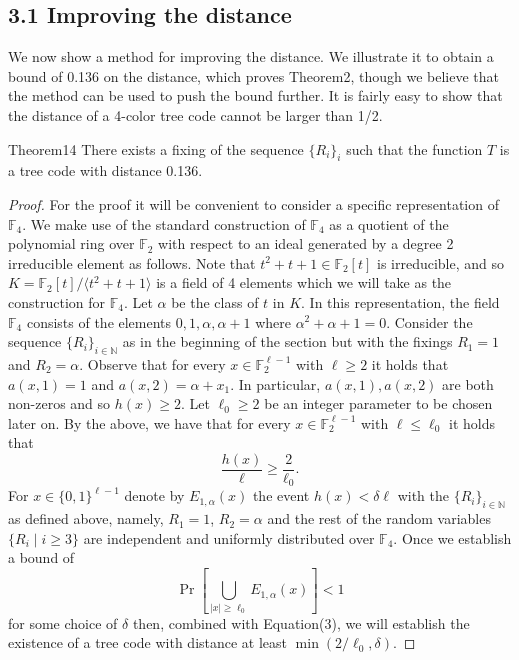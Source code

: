 \subsection*{3.1 Improving the distance}
We now show a method for improving the distance. We illustrate it to obtain a bound of 0.136 on the distance, which proves Theorem2, though we believe that the method can be used to push the bound further. It is fairly easy to show that the distance of a 4-color tree code cannot be larger than 1/2.
\begin{authorclaim}{Theorem14}
There exists a fixing of the sequence $\{R_i\}_i$ such that the function $T$ is a tree code with distance 0.136.
\end{authorclaim}
\begin{proof}
For the proof it will be convenient to consider a specific representation of $\mathbb F_4$. We make use of the standard construction of $\mathbb F_4$ as a quotient of the polynomial ring over $\mathbb F_2$ with respect to an ideal generated by a degree 2 irreducible element as follows. Note that $t^2+t+1\in\mathbb F_2[t]$ is irreducible, and so $K=\mathbb F_2[t]/\langle t^2+t+1\rangle$ is a field of 4 elements which we will take as the construction for $\mathbb F_4$. Let $\alpha$ be the class of $t$ in $K$. In this representation, the field $\mathbb F_4$ consists of the elements $0,1,\alpha,\alpha+1$ where $\alpha^2+\alpha+1=0$.
Consider the sequence $\{R_i\}_{i\in\mathbb N}$ as in the beginning of the section but with the fixings $R_1=1$ and $R_2=\alpha$. Observe that for every $x\in\mathbb F_2^{\ell-1}$ with $\ell\ge2$ it holds that $a(x,1)=1$ and $a(x,2)=\alpha+x_1$. In particular, $a(x,1),a(x,2)$ are both non-zeros and so $h(x)\ge2$. Let $\ell_0\ge2$ be an integer parameter to be chosen later on. By the above, we have that for every $x\in\mathbb F_2^{\ell-1}$ with $\ell\le\ell_0$ it holds that
\begin{equation}
\frac{h(x)}{\ell}\ge\frac2{\ell_0}.\tag{3}
\end{equation}
For $x\in\{0,1\}^{\ell-1}$ denote by $E_{1,\alpha}(x)$ the event $h(x)<\delta\ell$ with the $\{R_i\}_{i\in\mathbb N}$ as defined above, namely, $R_1=1$, $R_2=\alpha$ and the rest of the random variables $\{R_i\mid i\ge3\}$ are independent and uniformly distributed over $\mathbb F_4$. Once we establish a bound of
\begin{equation}
\Pr[\bigcup_{|x|\ge\ell_0}E_{1,\alpha}(x)]<1\tag{4}
\end{equation}
for some choice of $\delta$ then, combined with Equation(3), we will establish the existence of a tree code with distance at least $\min(2/\ell_0,\delta)$.

\end{proof}

